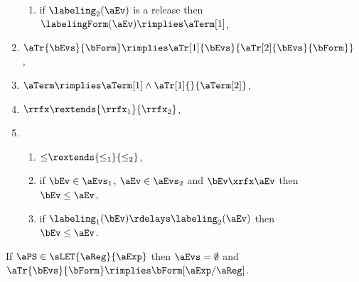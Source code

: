 \begin{figure}
\begin{multicols}{2}
\begin{enumerate}[topsep=0pt,label=(\textsc{s}\arabic*),ref=\textsc{s}\arabic*]
\begin{enumerate}[leftmargin=0pt]
      \item \label{seq-kappa-release}
        if $\labeling_2(\aEv)$ is a release then $\labelingForm(\aEv) \rimplies \aTerm[1]$,
      \end{enumerate}
    \item \label{seq-tau}
      $\aTr{\bEvs}{\bForm} \rimplies \aTr[1]{\bEvs}{\aTr[2]{\bEvs}{\bForm}}$,
    \item \label{seq-term}
      $\aTerm \rimplies \aTerm[1]\land\aTr[1]{}{\aTerm[2]}$,
    \item \label{seq-rf}
      ${\rrfx}\rextends{\rrfx_1}{\rrfx_2}$,
    \item[] 
      \begin{enumerate}[leftmargin=0pt]
      \item \label{seq-le-extends}
        ${\le}\rextends{\le_1}{\le_2}$, 
      \item \label{seq-le-rf}
        if $\bEv\in\aEvs_1$, $\aEv\in\aEvs_2$ and $\bEv\xrfx\aEv$ then $\bEv\le\aEv$,
      \item \label{seq-le-delays}
        if $\labeling_1(\bEv) \rdelays \labeling_2(\aEv)$ then $\bEv\le\aEv$.
      \end{enumerate}
    \end{enumerate}
  \end{multicols}
  \medskip

  \noindent
  If $\aPS\in\sLET{\aReg}{\aExp}$ then $\aEvs = \emptyset$ and
  $\aTr{\bEvs}{\bForm} \rimplies \bForm[\aExp/\aReg]$.
  \medskip


\end{figure}
